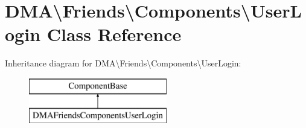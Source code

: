 \hypertarget{classDMA_1_1Friends_1_1Components_1_1UserLogin}{\section{D\+M\+A\textbackslash{}Friends\textbackslash{}Components\textbackslash{}User\+Login Class Reference}
\label{classDMA_1_1Friends_1_1Components_1_1UserLogin}
}
Inheritance diagram for D\+M\+A\textbackslash{}Friends\textbackslash{}Components\textbackslash{}User\+Login\+:\begin{figure}[H]
\begin{center}
\leavevmode
\includegraphics[height=2.000000cm]{df/d81/classDMA_1_1Friends_1_1Components_1_1UserLogin}
\end{center}
\end{figure}
